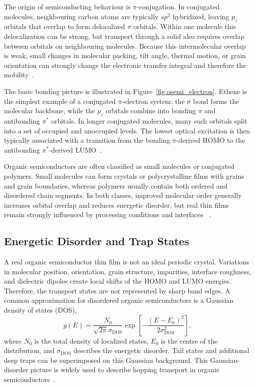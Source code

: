 The origin of semiconducting behaviour is $\pi$-conjugation. In conjugated
molecules, neighbouring carbon atoms are typically $sp^2$ hybridized, leaving
$p_z$ orbitals that overlap to form delocalized $\pi$ orbitals. Within one
molecule this delocalization can be strong, but transport through a solid also
requires overlap between orbitals on neighbouring molecules. Because this
intermolecular overlap is weak, small changes in molecular packing, tilt angle,
thermal motion, or grain orientation can strongly change the electronic transfer
integral and therefore the mobility~\cite{Coropceanu2007ChargeTransport}.

The basic bonding picture is illustrated in Figure~\ref{fig:osemi_electron}.
Ethene is the simplest example of a conjugated $\pi$-electron system: the
$\sigma$ bond forms the molecular backbone, while the $p_z$ orbitals combine
into bonding $\pi$ and antibonding $\pi^*$ orbitals. In longer conjugated
molecules, many such orbitals split into a set of occupied and unoccupied
levels. The lowest optical excitation is then typically associated with a
transition from the bonding $\pi$-derived HOMO to the antibonding
$\pi^*$-derived LUMO~\cite{Bruetting2005}.



Organic semiconductors are often classified as small molecules or conjugated
polymers. Small molecules can form crystals or polycrystalline films with grains
and grain boundaries, whereas polymers usually contain both ordered and
disordered chain segments. In both classes, improved molecular order generally
increases orbital overlap and reduces energetic disorder, but real thin films
remain strongly influenced by processing conditions and interfaces
~\cite{Bruetting2005,Sirringhaus2005DevicePhysics}.

\subsection{Energetic Disorder and Trap States}
\label{subsec:energetic_disorder_traps}

A real organic semiconductor thin film is not an ideal periodic crystal.
Variations in molecular position, orientation, grain structure, impurities,
interface roughness, and dielectric dipoles create local shifts of the HOMO and
LUMO energies. Therefore, the transport states are not represented by sharp band
edges. A common approximation for disordered organic semiconductors is a
Gaussian density of states (DOS),
\begin{equation}
    g(E) = \frac{N_0}{\sqrt{2\pi}\sigma_\mathrm{DOS}}
    \exp\left[-\frac{(E-E_0)^2}{2\sigma_\mathrm{DOS}^2}\right],
    \label{eq:gaussian_dos}
\end{equation}
where $N_0$ is the total density of localized states, $E_0$ is the centre of
the distribution, and $\sigma_\mathrm{DOS}$ describes the energetic disorder.
Tail states and additional deep traps can be superimposed on this Gaussian
background. This Gaussian-disorder picture is widely used to describe hopping
transport in organic semiconductors~\cite{Bassler1993ChargeTransport,Bruetting2005,Darwish2020DriftDiffusionOFET}.

